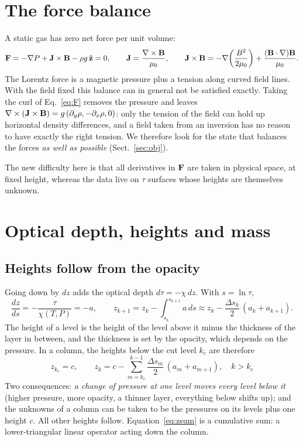 \section{The force balance}\label{sec:force}
A static gas has zero net force per unit volume:
\begin{equation}
\mathbf F=-\nabla P+\mathbf J\times\mathbf B-\rho g\,\hat{\mathbf z}=0 ,\qquad
\mathbf J=\frac{\nabla\times\mathbf B}{\mu_0},\qquad
\mathbf J\times\mathbf B=-\nabla\!\left(\frac{B^2}{2\mu_0}\right)+\frac{(\mathbf B\cdot\nabla)\mathbf B}{\mu_0}.\label{eq:F}
\end{equation}
The Lorentz force is a magnetic pressure plus a tension along curved field lines. With the field fixed this balance can in
general not be satisfied exactly. Taking the curl of Eq.~\eqref{eq:F} removes the pressure and leaves
$\nabla\times(\mathbf J\times\mathbf B)=g\,(\partial_y\rho,-\partial_x\rho,0)$: only the tension of the field can hold up horizontal
density differences, and a field taken from an inversion has no reason to have exactly the right tension. We therefore look
for the state that balances the forces \emph{as well as possible} (Sect.~\ref{sec:obj}).

The new difficulty here is that all derivatives in $\mathbf F$ are taken in physical space, at fixed height, whereas the data live
on $\tau$ surfaces whose heights are themselves unknown.

\section{Optical depth, heights and mass}\label{sec:geom}
\subsection{Heights follow from the opacity}
Going down by $dz$ adds the optical depth $d\tau=-\chi\,dz$. With $s=\ln\tau$,
\begin{equation}
\frac{dz}{ds}=-\frac{\tau}{\chi(T,P)}=-a ,\qquad
z_{k+1}=z_k-\int_{s_k}^{s_{k+1}}a\,ds\approx z_k-\frac{\Delta s_k}{2}\,(a_k+a_{k+1}) .\label{eq:height}
\end{equation}
The height of a level is the height of the level above it minus the thickness of the layer in between, and the thickness is
set by the opacity, which depends on the pressure. In a column, the heights below the cut level $k_c$ are therefore
\begin{equation}
\boxed{\;z_{k_c}=c,\qquad z_k=c-\sum_{m=k_c}^{k-1}\frac{\Delta s_m}{2}\,(a_m+a_{m+1}),\quad k>k_c\;}\label{eq:zsum}
\end{equation}
Two consequences: \emph{a change of pressure at one level moves every level below it} (higher pressure, more opacity, a
thinner layer, everything below shifts up); and the unknowns of a column can be taken to be the pressures on its levels plus
one height $c$. All other heights follow. Equation~\eqref{eq:zsum} is a cumulative sum: a lower-triangular linear operator
acting down the column.

